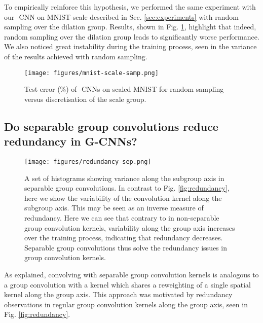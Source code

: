 \documentclass[nohyperref]{article}
\theoremstyle{plain}
\theoremstyle{definition}
\theoremstyle{remark}
\begin{document}
To empirically reinforce this hypothesis, we performed the same experiment with our -CNN on MNIST-scale described in Sec.  \ref{sec:experiments} with random sampling over the dilation group. Results, shown in Fig. \ref{fig:samplingscaledmnist}, highlight that indeed, random sampling over the dilation group leads to significantly worse performance. We also noticed great instability during the training process, seen in the variance of the results achieved with random sampling.

\begin{figure}
\centering
  \texttt{[image: figures/mnist-scale-samp.png]}
  \caption{Test error (\%) of -CNNs on scaled MNIST for random sampling versus discretisation of the scale group.}
  \label{fig:samplingscaledmnist}
\end{figure}

\subsection{Do separable group convolutions reduce redundancy in G-CNNs?}
\begin{figure}
\begin{center}
\texttt{[image: figures/redundancy-sep.png]}
\end{center}
\vspace{-2mm}
\caption{A set of histograms showing variance along the subgroup axis in separable group convolutions. In contrast to Fig. \ref{fig:redundancy}, here we show the variability of the convolution kernel along the subgroup axis. This may be seen as an inverse measure of redundancy. Here we can see that contrary to in non-separable group convolution kernels, variability along the group axis increases over the training process, indicating that redundancy decreases. Separable group convolutions thus solve the redundancy issues in group convolution kernels.
\vspace{-2mm}}
\label{fig:redundancy-sep}
\end{figure}
As explained, convolving with separable group convolution kernels is analogous to a group convolution with a kernel which shares a reweighting of a single spatial kernel along the group axis. This approach was motivated by redundancy observations in regular group convolution kernels along the group axis, seen in Fig. \ref{fig:redundancy}.
\end{document}
